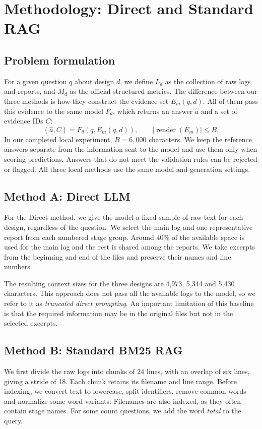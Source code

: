 \documentclass[11pt,a4paper]{article}
\begin{document}
\section{Methodology: Direct and Standard RAG}
\subsection{Problem formulation}
For a given question $q$ about design $d$, we define $L_d$ as the collection of raw logs and reports, and $M_d$ as the official structured metrics. The difference between our three methods is how they construct the evidence set $E_m(q,d)$. All of them pass this evidence to the same model $F_\theta$, which returns an answer $\hat a$ and a set of evidence IDs $C$:
\begin{equation}
(\hat a,C)=F_\theta(q,E_m(q,d)),\qquad |\operatorname{render}(E_m)|\le B.
\end{equation}
In our completed local experiment, $B=6{,}000$ characters. We keep the reference answers separate from the information sent to the model and use them only when scoring predictions. Answers that do not meet the validation rules can be rejected or flagged. All three local methods use the same model and generation settings.
\subsection{Method A: Direct LLM}
For the Direct method, we give the model a fixed sample of raw text for each design, regardless of the question. We select the main log and one representative report from each numbered stage group. Around 40\% of the available space is used for the main log and the rest is shared among the reports. We take excerpts from the beginning and end of the files and preserve their names and line numbers.

The resulting context sizes for the three designs are 4,973, 5,344 and 5,430 characters. This approach does not pass all the available logs to the model, so we refer to it as \emph{truncated direct prompting}. An important limitation of this baseline is that the required information may be in the original files but not in the selected excerpts.
\subsection{Method B: Standard BM25 RAG}
We first divide the raw logs into chunks of 24 lines, with an overlap of six lines, giving a stride of 18. Each chunk retains its filename and line range. Before indexing, we convert text to lowercase, split identifiers, remove common words and normalize some word variants. Filenames are also indexed, as they often contain stage names. For some count questions, we add the word \emph{total} to the query.
\end{document}
